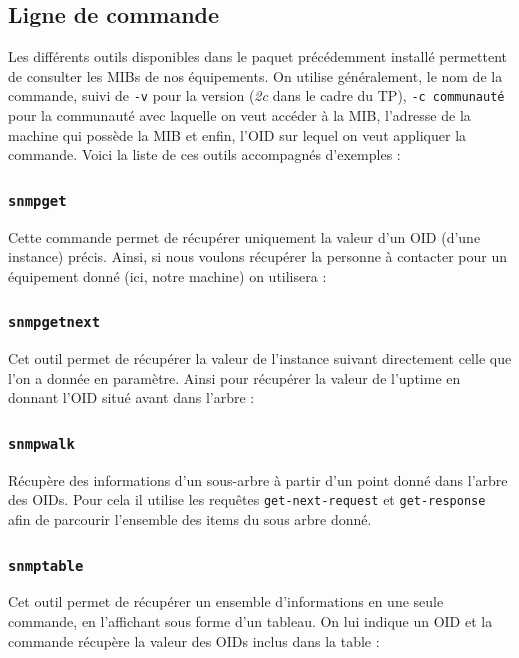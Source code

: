 \documentclass[12pt,a4paper,notitlepage]{article}
\begin{document}
\subsection{Ligne de commande}
Les différents outils disponibles dans le paquet précédemment installé permettent de consulter les MIBs de nos équipements. On utilise généralement, le nom de la commande, suivi de \texttt{-v} pour la version (\textit{2c} dans le cadre du TP), \texttt{-c communauté} pour la communauté avec laquelle on veut accéder à la MIB, l'adresse de la machine qui possède la MIB et enfin, l'OID sur lequel on veut appliquer la commande. Voici la liste de ces outils accompagnés d'exemples :\\




\subsubsection{\texttt{snmpget}}
Cette commande permet de récupérer uniquement la valeur d'un OID (d'une instance) précis. Ainsi, si nous voulons récupérer la personne à contacter pour un équipement donné (ici, notre machine) on utilisera :\\


\noindent {}

\subsubsection{\texttt{snmpgetnext}}
Cet outil permet de récupérer la valeur de l'instance suivant directement celle que l'on a donnée en paramètre. Ainsi pour récupérer la valeur de l'uptime en donnant l'OID situé avant dans l'arbre :\\

\noindent {}

\subsubsection{\texttt{snmpwalk}}
Récupère des informations d'un sous-arbre à partir d'un point donné dans l'arbre des OIDs. Pour cela il utilise les requêtes \texttt{get-next-request} et \texttt{get-response} afin de parcourir l'ensemble des items du sous arbre donné.

\subsubsection{\texttt{snmptable}}
Cet outil permet de récupérer un ensemble d'informations en une seule commande, en l'affichant sous forme d'un tableau. On lui indique un OID et la commande récupère la valeur des OIDs inclus dans la table :\\
\end{document}
